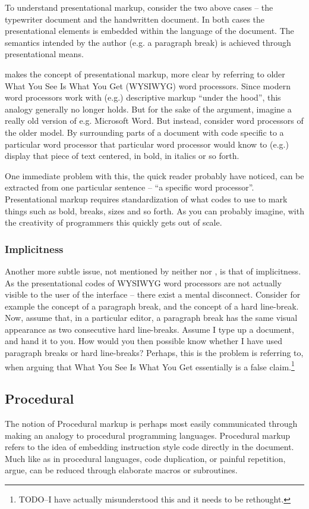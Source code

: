 \documentclass{scrreprt}
\begin{document}
To understand presentational markup, consider the two above cases -- the typewriter document and the handwritten document. In both cases the presentational elements is embedded within the language of the document. The semantics intended by the author (e.g. a paragraph break) is achieved through presentational means.

\citet{bray} makes the concept of presentational markup, more clear by referring to older What You See Is What You Get (WYSIWYG) word processors. Since modern word processors work with (e.g.) descriptive markup ``under the hood'', this analogy generally no longer holds. But for the sake of the argument, imagine a really old version of e.g. Microsoft Word. But instead, consider word processors of the older model. By surrounding parts of a document with code specific to a particular word processor that particular word processor would know to (e.g.) display that piece of text centered, in bold, in italics or so forth.

One immediate problem with this, the quick reader probably have noticed, can be extracted from one particular sentence -- ``a specific word processor''. Presentational markup requires standardization of what codes to use to mark things such as bold, breaks, sizes and so forth. As you can probably imagine, with the creativity of programmers this quickly gets out of scale.

\subsubsection{Implicitness}
Another more subtle issue, not mentioned by neither \citet{coombs} nor \citet{bray}, is that of implicitness. As the presentational codes of WYSIWYG word processors are not actually visible to the user of the interface -- there exist a mental disconnect. Consider for example the concept of a paragraph break, and the concept of a hard line-break. Now, assume that, in a particular editor, a paragraph break has the same visual appearance as two consecutive hard line-breaks. Assume I type up a document, and hand it to you. How would you then possible know whether I have used paragraph breaks or hard line-breaks? Perhaps, this is the problem \citet{bray} is referring to, when arguing that What You See Is What You Get essentially is a false claim.\footnote{TODO--I have actually misunderstood this and it needs to be rethought.}



\subsection{Procedural}
The notion of Procedural markup is perhaps most easily communicated through making an analogy to procedural programming languages. Procedural markup refers to the idea of embedding instruction style code directly in the document. Much like as in procedural languages, code duplication, or painful repetition, \citet{bray} argue, can be reduced through elaborate macros or subroutines.
\end{document}
